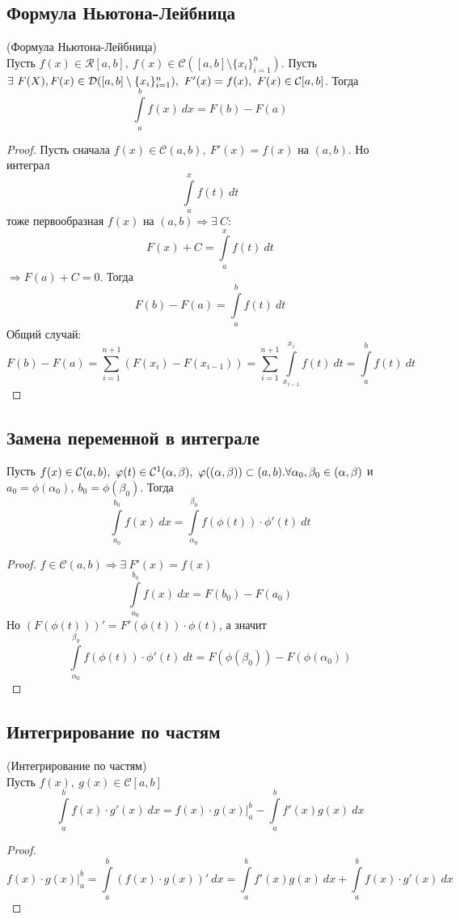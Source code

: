 \subsection{Формула Ньютона-Лейбница}
\begin{theorem} (Формула Ньютона-Лейбница)\\
    Пусть $f(x)\in \mathcal{R}[a,b],\ f(x)\in \mathcal{C}([a,b]\setminus \{x_i\}_{i=1}^{n})$. Пусть $\exists\ F(X),\\
    F(x)\in \mathcal{D}([a,b]\setminus \{x_i\}_{i=1}^{n}),\ F'(x)=f(x),\ F(x)\in \mathcal{C}[a,b]$. Тогда 
    \[\int\limits_{a}^{b}f(x)\ dx=F(b)-F(a)\]
\end{theorem} 
\begin{proof}
    Пусть сначала $f(x)\in \mathcal{C}(a,b),\ F'(x)=f(x)$ на $(a,b)$. Но интеграл
    \[\int\limits_{a}^{x}f(t)\ dt\]
    тоже первообразная $f(x)$ на $(a,b) \Rightarrow \exists\ C:$
    \[F(x)+C=\int\limits_{a}^{x}f(t)\ dt\]
    $\Rightarrow F(a)+C=0$. Тогда 
    \[F(b)-F(a)=\int\limits_{a}^{b} f(t)\ dt\]
    Общий случай:
        \[F(b)-F(a)=\sum\limits_{i=1}^{n+1}(F(x_i)-F(x_{i-1}))=\sum\limits_{i=1}^{n+1} \int\limits_{x_{i-1}}^{x_i} f(t)\ dt=\int\limits_{a}^{b} f(t)\ dt\]
\end{proof} 
\subsection{Замена переменной в интеграле}
\begin{theorem}
    Пусть $f(x)\in \mathcal{C}(a,b),\ \phi(t)\in \mathcal{C}^1(\alpha, \beta),\ \phi((\alpha, \beta))\subset (a,b).\\
    \forall \alpha_0, \beta_0\in (\alpha, \beta)$ и $a_0=\phi(\alpha_0),\ b_0=\phi(\beta_0)$. Тогда
    \[\int\limits_{a_0}^{b_0}f(x)\ dx=\int\limits_{\alpha_0}^{\beta_0}f(\phi(t))\cdot \phi'(t)\ dt\]
\end{theorem} 
\begin{proof}
    $f\in \mathcal{C}(a,b) \Rightarrow \exists\ F'(x)=f(x)$
    \[\int\limits_{a_0}^{b_0}f(x)\ dx= F(b_0)-F(a_0)\]
    Но $(F(\phi(t)))'=F'(\phi(t))\cdot \phi(t)$, а значит
    \[\int\limits_{\alpha_0}^{\beta_0}f(\phi(t))\cdot\phi'(t)\ dt=F(\phi(\beta_0))-F(\phi(\alpha_0))\]
\end{proof} 
\subsection{Интегрирование по частям}
\begin{theorem} (Интегрирование по частям)\\
    Пусть $f(x),\ g(x)\in \mathcal{C}[a,b]$
    \[\int\limits_{a}^{b}f(x)\cdot g'(x)\ dx=f(x)\cdot g(x)|_a^b-\int\limits_{a}^{b}f'(x)g(x)\ dx\]
\end{theorem} 
\begin{proof}
    \[f(x)\cdot g(x)|_a^b=\int\limits_{a}^{b}(f(x)\cdot g(x))'\ dx=\int\limits_{a}^{b}f'(x)g(x)\ dx+\int\limits_{a}^{b}f(x)\cdot g'(x)\ dx\]
\end{proof} 
\newpage
